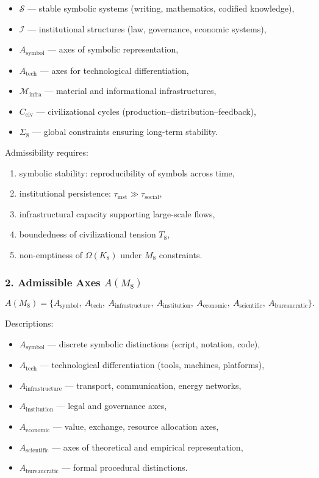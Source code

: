 \begin{itemize}
    \item $\mathcal{S}$ — stable symbolic systems (writing, mathematics, codified knowledge),
    \item $\mathcal{I}$ — institutional structures (law, governance, economic systems),
    \item $A_{\mathrm{symbol}}$ — axes of symbolic representation,
    \item $A_{\mathrm{tech}}$ — axes for technological differentiation,
    \item $\mathcal{M}_{\mathrm{infra}}$ — material and informational infrastructures,
    \item $C_{\mathrm{civ}}$ — civilizational cycles (production–distribution–feedback),
    \item $\Sigma_8$ — global constraints ensuring long-term stability.
\end{itemize}

Admissibility requires:

\begin{enumerate}
    \item symbolic stability: reproducibility of symbols across time,
    \item institutional persistence: $\tau_{\mathrm{inst}} \gg \tau_{\mathrm{social}}$,
    \item infrastructural capacity supporting large-scale flows,
    \item boundedness of civilizational tension $T_8$,
    \item non-emptiness of $\Omega(K_8)$ under $M_8$ constraints.
\end{enumerate}

\subsubsection*{2. Admissible Axes \texorpdfstring{$A(M_8)$}{A(M_8)}}

\[
A(M_8)=
\{
A_{\mathrm{symbol}},\
A_{\mathrm{tech}},\
A_{\mathrm{infrastructure}},\
A_{\mathrm{institution}},\
A_{\mathrm{economic}},\
A_{\mathrm{scientific}},\
A_{\mathrm{bureaucratic}}
\}.
\]

Descriptions:

\begin{itemize}
    \item $A_{\mathrm{symbol}}$ — discrete symbolic distinctions (script, notation, code),
    \item $A_{\mathrm{tech}}$ — technological differentiation (tools, machines, platforms),
    \item $A_{\mathrm{infrastructure}}$ — transport, communication, energy networks,
    \item $A_{\mathrm{institution}}$ — legal and governance axes,
    \item $A_{\mathrm{economic}}$ — value, exchange, resource allocation axes,
    \item $A_{\mathrm{scientific}}$ — axes of theoretical and empirical representation,
    \item $A_{\mathrm{bureaucratic}}$ — formal procedural distinctions.
\end{itemize}

